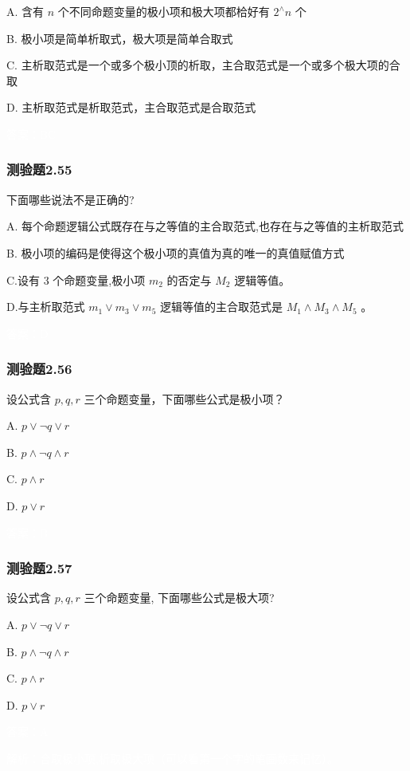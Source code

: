 \documentclass[UTF8, heading=true]{ctexart}
\begin{document}
A. 含有 $n$ 个不同命题变量的极小项和极大项都㭘好有 $2^{\wedge} n$ 个

B. 极小项是简单析取式，极大项是简单合取式

C. 主析取范式是一个或多个极小顶的析取，主合取范式是一个或多个极大项的合取

D.  主析取范式是析取范式，主合取范式是合取范式

\textcolor{white}{答案：BC}

\subsubsection{测验题2.55}

下面哪些说法不是正确的?

A. 每个命题逻辑公式既存在与之等值的主合取范式,也存在与之等值的主析取范式

B. 极小项的编码是使得这个极小项的真值为真的唯一的真值赋值方式

C.设有 3 个命题变量,极小项 $m_2$ 的否定与 $M_2$ 逻辑等值。

D.与主析取范式 $m_1 \vee m_3 \vee m_5$ 逻辑等值的主合取范式是 $M_1 \wedge M_3 \wedge M_5$ 。

\textcolor{white}{答案：D}

\subsubsection{测验题2.56}

设公式含 $p, q, r$ 三个命题变量，下面哪些公式是极小项？

A. $p \vee \neg q \vee r$

B. $p \wedge \neg q \wedge r$

C. $p \wedge r$

D.  $p \vee r$

\textcolor{white}{答案：B}

\subsubsection{测验题2.57}

设公式含 $p, q, r$ 三个命题变量, 下面哪些公式是极大项?

A. $ p \vee \neg q \vee r$

B. $ p \wedge \neg q \wedge r$

C. $ p \wedge r$

D. $ p \vee r$

\textcolor{white}{答案：A}

\textcolor{white}{解析：合取极小项,析取极大项（可以看第一个字的笔画数来记忆）。}
\end{document}
